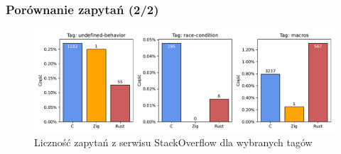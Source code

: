 \documentclass{beamer}
\begin{document}
\begin{frame}
	\frametitle{Porównanie zapytań (2/2)}

	\begin{figure}
		\includegraphics[width=\linewidth]{img/plots/issues/2.pdf}
		\caption{Liczność zapytań z serwisu StackOverflow dla wybranych tagów \cite{so-db}}
		\centering
	\end{figure}
\end{frame}
\end{document}
